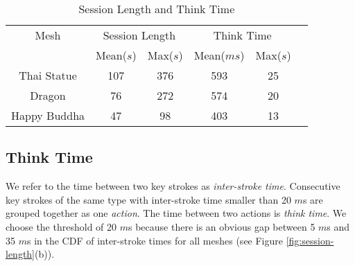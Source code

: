 
\begin{table}[hbp!]
\begin{center}
\begin{tabular}{|c|c|c|c|c|c|}
\hline 
Mesh&\multicolumn{2}{c|}{Session Length}&\multicolumn{2}{c|}{Think Time}\\
\cline{2-5}
&Mean($s$)&Max($s$)&Mean($ms$)&Max($s$)\\
\hline
Thai Statue&107&376&593&25\\
\hline
Dragon&76&272&574&20\\
\hline
Happy Buddha&47&98&403&13\\
\hline
\end{tabular}
\caption{Session Length and Think Time\label{t:TimeTable}}
\end{center}
\end{table}%

\subsection{Think Time}
We refer to the time between two key strokes as \textit{inter-stroke time}. 
Consecutive key strokes of the same type with inter-stroke time smaller than 20 $m$s
are grouped together as one \textit{action}. 
The time between two actions is \textit{think time}. 
We choose the threshold of 20 $m$s because there is an obvious gap between 5 $m$s and 35 $m$s
in the CDF of inter-stroke times for all meshes (see Figure \ref{fig:session-length}(b)).

